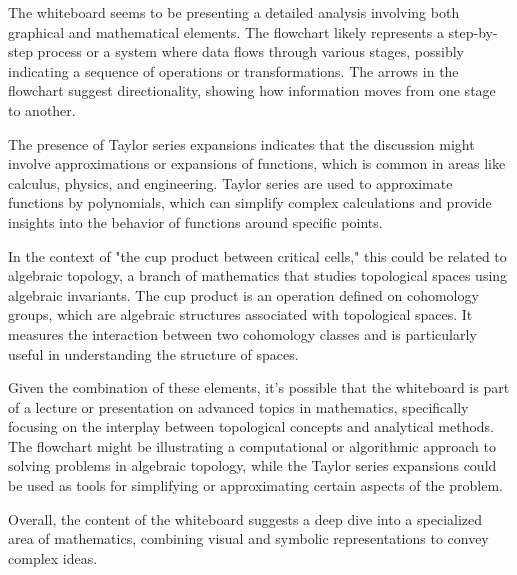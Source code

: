 The whiteboard seems to be presenting a detailed analysis involving both graphical and mathematical elements. The flowchart likely represents a step-by-step process or a system where data flows through various stages, possibly indicating a sequence of operations or transformations. The arrows in the flowchart suggest directionality, showing how information moves from one stage to another.

The presence of Taylor series expansions indicates that the discussion might involve approximations or expansions of functions, which is common in areas like calculus, physics, and engineering. Taylor series are used to approximate functions by polynomials, which can simplify complex calculations and provide insights into the behavior of functions around specific points.

In the context of "the cup product between critical cells," this could be related to algebraic topology, a branch of mathematics that studies topological spaces using algebraic invariants. The cup product is an operation defined on cohomology groups, which are algebraic structures associated with topological spaces. It measures the interaction between two cohomology classes and is particularly useful in understanding the structure of spaces.

Given the combination of these elements, it's possible that the whiteboard is part of a lecture or presentation on advanced topics in mathematics, specifically focusing on the interplay between topological concepts and analytical methods. The flowchart might be illustrating a computational or algorithmic approach to solving problems in algebraic topology, while the Taylor series expansions could be used as tools for simplifying or approximating certain aspects of the problem.

Overall, the content of the whiteboard suggests a deep dive into a specialized area of mathematics, combining visual and symbolic representations to convey complex ideas.